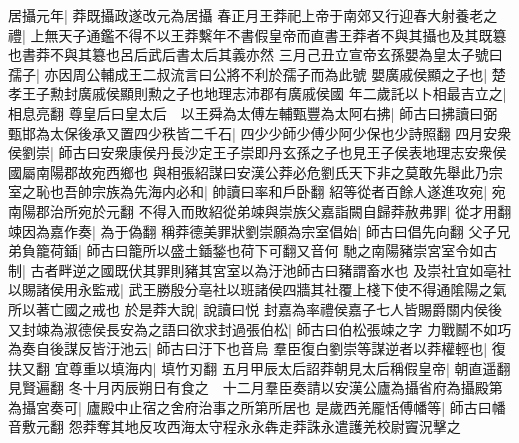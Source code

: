 居攝元年|{
	莽既攝政遂改元為居攝}
春正月王莽祀上帝于南郊又行迎春大射養老之禮|{
	上無天子通鑑不得不以王莽繫年不書假皇帝而直書王莽者不與其攝也及其既簒也書莽不與其簒也呂后武后書太后其義亦然}
三月己丑立宣帝玄孫嬰為皇太子號曰孺子|{
	亦因周公輔成王二叔流言曰公將不利於孺子而為此號}
嬰廣戚侯顯之子也|{
	楚孝王子勲封廣戚侯顯則勲之子也地理志沛郡有廣戚侯國}
年二歲託以卜相最吉立之|{
	相息亮翻}
尊皇后曰皇太后　以王舜為太傅左輔甄豐為太阿右拂|{
	師古曰拂讀曰弼}
甄邯為太保後承又置四少秩皆二千石|{
	四少少師少傅少阿少保也少詩照翻}
四月安衆侯劉崇|{
	師古曰安衆康侯丹長沙定王子崇即丹玄孫之子也見王子侯表地理志安衆侯國屬南陽郡故宛西鄉也}
與相張紹謀曰安漢公莽必危劉氏天下非之莫敢先舉此乃宗室之恥也吾帥宗族為先海内必和|{
	帥讀曰率和戶卧翻}
紹等從者百餘人遂進攻宛|{
	宛南陽郡治所宛於元翻}
不得入而敗紹從弟竦與崇族父嘉詣闕自歸莽赦弗罪|{
	從才用翻}
竦因為嘉作奏|{
	為于偽翻}
稱莽德美罪狀劉崇願為宗室倡始|{
	師古曰倡先向翻}
父子兄弟負籠荷鍤|{
	師古曰籠所以盛土鍤鍫也荷下可翻又音何}
馳之南陽豬崇宮室令如古制|{
	古者畔逆之國既伏其罪則豬其宮室以為汙池師古曰豬謂畜水也}
及崇社宜如亳社以賜諸侯用永監戒|{
	武王勝殷分亳社以班諸侯四牆其社覆上棧下使不得通隂陽之氣所以著亡國之戒也}
於是莽大說|{
	說讀曰悦}
封嘉為率禮侯嘉子七人皆賜爵關内侯後又封竦為淑德侯長安為之語曰欲求封過張伯松|{
	師古曰伯松張竦之字}
力戰鬭不如巧為奏自後謀反皆汙池云|{
	師古曰汙下也音烏}
羣臣復白劉崇等謀逆者以莽權輕也|{
	復扶又翻}
宜尊重以填海内|{
	填竹刃翻}
五月甲辰太后詔莽朝見太后稱假皇帝|{
	朝直遥翻見賢遍翻}
冬十月丙辰朔日有食之　十二月羣臣奏請以安漢公廬為攝省府為攝殿第為攝宮奏可|{
	廬殿中止宿之舍府治事之所第所居也}
是歲西羌龎恬傅幡等|{
	師古曰幡音敷元翻}
怨莽奪其地反攻西海太守程永永犇走莽誅永遣護羌校尉竇況擊之

